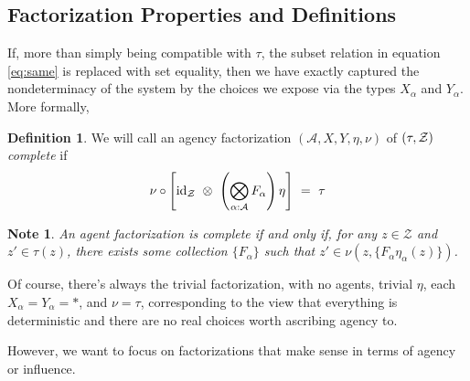\documentclass{article}
\newtheorem{note}{Note}
\theoremstyle{definition}
\newtheorem{defn}{Definition}
\newcommand{\Z}{\mathcal Z}
\begin{document}
	\subsection{Factorization Properties and Definitions}

	If, more than simply being compatible with $\tau$, the subset relation in equation \eqref{eq:same} is replaced with set equality, then we have exactly captured the nondeterminacy of the system by the choices we expose via the types $X_\alpha$ and $Y_\alpha$. More formally,
	
	\vspace{1em}
	\begin{defn}
		We will call an agency factorization $(\mathcal A, X, Y, \eta, \nu)$ of $(\tau, \cal Z)$ \emph{complete} if
		\begin{equation*} 
		\nu \circ \left[ \mathrm{id}_\Z  ~\otimes~ \left(\bigotimes_{\alpha : \cal A} F_\alpha \right) \eta \right] ~=~\tau
		\end{equation*} 
	\end{defn}

	\vspace{1em}
	\begin{note}
		An agent factorization is complete if and only if, for any $z \in \Z$ and $z' \in \tau(z)$, there exists some collection $\{F_\alpha\}$ such that $z' \in \nu(z, \{F_\alpha\eta_\alpha(z)\})$.
	\end{note}


	Of course, there's always the trivial factorization, with no agents, trivial $\eta$, each $X_\alpha = Y_\alpha = *$, and $\nu = \tau$, corresponding to the view that everything is deterministic and there are no real choices worth ascribing agency to. 
	
	
	However, we want to focus on factorizations that make sense in terms of agency or influence.
\end{document}
